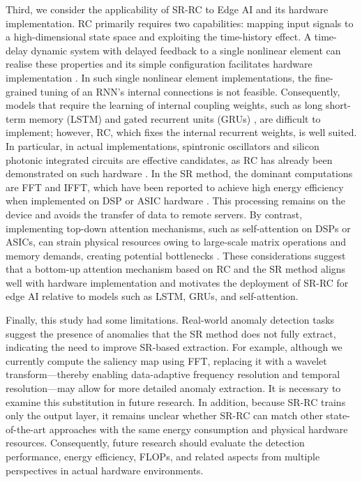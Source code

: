 \documentclass[pdflatex,sn-nature]{sn-jnl}
\theoremstyle{thmstyleone}%
\theoremstyle{thmstyletwo}%
\theoremstyle{thmstylethree}%
\begin{document}
Third, we consider the applicability of SR-RC to Edge AI and its hardware implementation.
RC primarily requires two capabilities: mapping input signals to a high-dimensional state space and exploiting the time-history effect.
A time-delay dynamic system with delayed feedback to a single nonlinear element can realise these properties and its simple configuration facilitates hardware implementation \cite{tanaka2019recent}.
In such single nonlinear element implementations, the fine-grained tuning of an RNN’s internal connections is not feasible.
Consequently, models that require the learning of internal coupling weights, such as long short-term memory (LSTM) \cite{hochreiter1997long} and gated recurrent units (GRUs) \cite{cho2014learning}, are difficult to implement; however, RC, which fixes the internal recurrent weights, is well suited.
In particular, in actual implementations, spintronic oscillators and silicon photonic integrated circuits are effective candidates, as RC has already been demonstrated on such hardware \cite{tanaka2019recent,nakajima2020physical,marrows2024neuromorphic,van2017advances}.
In the SR method, the dominant computations are FFT and IFFT, which have been reported to achieve high energy efficiency when implemented on DSP or ASIC hardware \cite{garrido2022survey,garrido2020evolution,noor2018design}.
This processing remains on the device and avoids the transfer of data to remote servers.
By contrast, implementing top-down attention mechanisms, such as self-attention on DSPs or ASICs, can strain physical resources owing to large-scale matrix operations and memory demands, creating potential bottlenecks \cite{kang2024survey, leroux2025analog, bettayeb2024efficient}.
These considerations suggest that a bottom-up attention mechanism based on RC and the SR method aligns well with hardware implementation and motivates the deployment of SR-RC for edge AI relative to models such as LSTM, GRUs, and self-attention.

Finally, this study had some limitations.
Real-world anomaly detection tasks suggest the presence of anomalies that the SR method does not fully extract, indicating the need to improve SR-based extraction.
For example, although we currently compute the saliency map using FFT, replacing it with a wavelet transform—thereby enabling data-adaptive frequency resolution and temporal resolution—may allow for more detailed anomaly extraction.
It is necessary to examine this substitution in future research.
In addition, because SR-RC trains only the output layer, it remains unclear whether SR-RC can match other state-of-the-art approaches with the same energy consumption and physical hardware resources.
Consequently, future research should evaluate the detection performance, energy efficiency, FLOPs, and related aspects from multiple perspectives in actual hardware environments.
\end{document}
